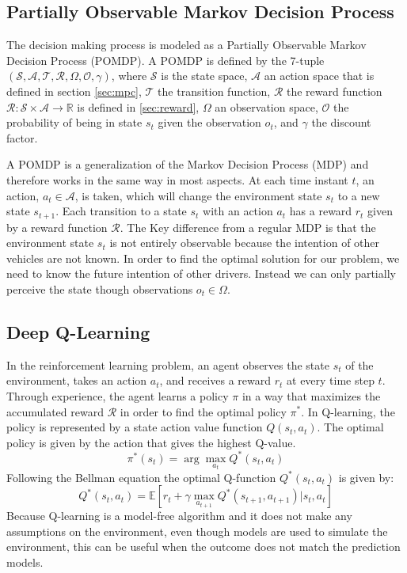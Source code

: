 \subsection{Partially Observable Markov Decision Process}\label{sec:pomdp}
The decision making process is modeled as a Partially Observable Markov Decision Process (POMDP). A POMDP is defined by the 7-tuple $(\mathcal{S},\mathcal{A},\mathcal{T},\mathcal{R},\Omega ,\mathcal{O},\gamma)$, where $\mathcal{S}$ is the state space, $\mathcal{A}$ an action space that is defined in section \ref{sec:mpc}, $\mathcal{T}$ the transition function, %
$\mathcal{R}$ the reward function $\mathcal{R}: \mathcal{S} \times \mathcal{A} \to \mathbb{R}$ is defined in \ref{sec:reward}, $\Omega$ an observation space, $\mathcal{O}$ the probability of being in state $s_{t}$ given the observation $o_t$, and $\gamma$ the discount factor.

A POMDP is a generalization of the Markov Decision Process (MDP) \cite{BellmanMDP} and therefore works in the same way in most aspects. At each time instant $t$, an action, $a_t\in \mathcal{A}$, is taken, which will change the environment state $s_t$ to a new state $s_{t+1}$. Each transition to a state $s_t$ with an action $a_t$ has a reward $r_t$ given by a reward function $\mathcal{R} $. The Key difference from a regular MDP is that the environment state $s_t$ is not entirely observable because the intention of other vehicles are not known. In order to find the optimal solution for our problem, we need to know the future intention of other drivers. Instead we can only partially perceive the state though observations $o_t\in \Omega$.

\subsection{Deep Q-Learning}
In the reinforcement learning problem, an agent observes the state $s_t$ of the environment, takes an action $a_t$, and receives a reward $r_t$ at every time step $t$. Through experience, the agent learns a policy $\pi$ in a way that maximizes the accumulated reward $\mathcal{R}$ in order to find the optimal policy $\pi^*$. In Q-learning, the policy is represented by a state action value function $Q(s_t,a_t)$. The optimal policy is given by the action that gives the highest Q-value. 
\begin{equation}
\pi^*(s_t) = \arg\max_{a_t} Q^*(s_t,a_t)
\label{eq:optimal_policy}
\end{equation}
Following the Bellman equation the optimal Q-function $Q^*(s_t,a_t)$ is given by:
 \begin{equation}
 Q^*(s_t,a_t)= \mathbb{E}[r_t + \gamma \max_{a_{t+1}} Q^*(s_{t+1}, a_{t+1})| s_t, a_t]
 \label{eq:q-function}
 \end{equation}
Because Q-learning is a model-free algorithm and it does not make any assumptions on the environment, even though models are used to simulate the environment, this can be useful when the outcome does not match the prediction models. 


